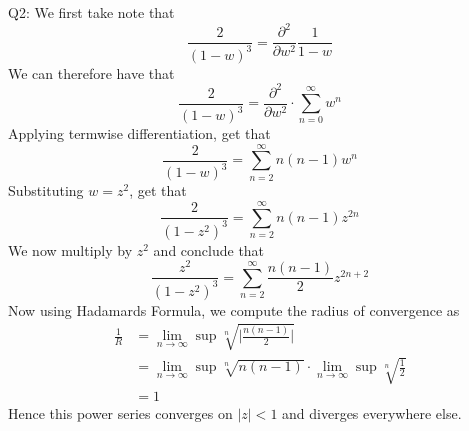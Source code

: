 \documentclass[letterpaper]{article}
\begin{document}
\noindent
Q2: We first take note that $$\frac{2}{(1-w)^3} =  \frac{\partial^2}{\partial w^2} \frac{1}{1-w}$$
We can therefore have that $$\frac{2}{(1-w)^3} =  \frac{\partial^2}{\partial w^2} \cdot \sum_{n=0}^\infty w^n$$
Applying termwise differentiation, get that $$\frac{2}{(1-w)^3} = \sum_{n=2}^\infty n(n-1)w^n$$
Substituting $w = z^2$, get that 
$$\frac{2}{(1-z^2)^3} = \sum_{n=2}^\infty n(n-1)z^{2n}$$
We now multiply by $z^2$ and conclude that 
$$\frac{z^2}{(1-z^2)^3} = \sum_{n=2}^\infty \frac{n(n-1)}{2}z^{2n+2}$$
Now using Hadamards Formula, we compute the radius of convergence as 
\begin{align*}
    \frac{1}{R} & = \lim_{n \to \infty} \sup \sqrt[n]{\Big|\frac{n(n-1)}{2} \Big|}
    \\ & = \lim_{n \to \infty} \sup \sqrt[n]{n(n-1)} \cdot \lim_{n \to \infty} \sup \sqrt[n]{\frac{1}{2}}
    \\ & =1
\end{align*}Hence this power series converges on $|z|<1$ and diverges everywhere else. 
\end{document}
